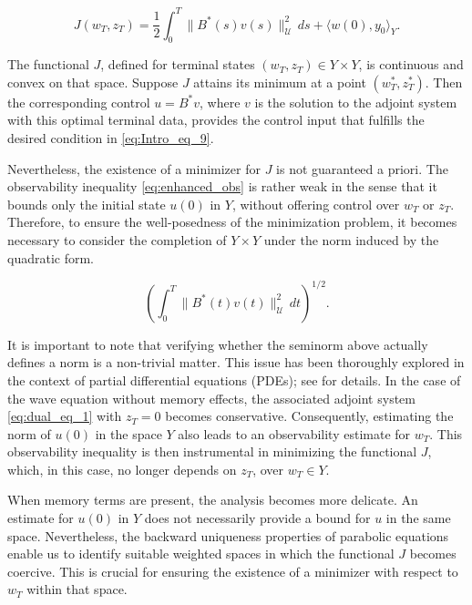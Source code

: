\documentclass[12pt]{article}
\theoremstyle{plain}
\theoremstyle{definition}
\begin{document}
\begin{equation}
J(w_T, z_T) = \frac{1}{2} \int_0^T \|B^*(s)v(s)\|_{\mathcal{U}}^2 \, ds + \langle w(0), y_0 \rangle_Y.
\end{equation}

The functional \( J \), defined for terminal states \( (w_T, z_T) \in Y \times Y \), is continuous and convex on that space. Suppose \( J \) attains its minimum at a point \( (w_T^*, z_T^*) \). Then the corresponding control \( u = B^*v \), where \( v \) is the solution to the adjoint system with this optimal terminal data, provides the control input that fulfills the desired condition in \eqref{eq:Intro_eq_9}.

Nevertheless, the existence of a minimizer for \( J \) is not guaranteed a priori. The observability inequality \eqref{eq:enhanced_obs} is rather weak in the sense that it bounds only the initial state \( u(0) \) in \( Y \), without offering control over \( w_T \) or \( z_T \). Therefore, to ensure the well-posedness of the minimization problem, it becomes necessary to consider the completion of \( Y \times Y \) under the norm induced by the quadratic form.

\begin{equation}
\left( \int_0^T \| B^*(t)v(t) \|_{\mathcal{U}}^2 \, dt \right)^{1/2}.
\end{equation}

It is important to note that verifying whether the seminorm above actually defines a norm is a non-trivial matter. This issue has been thoroughly explored in the context of partial differential equations (PDEs); see \cite{zuazua2007controllability} for details. In the case of the wave equation without memory effects, the associated adjoint system \eqref{eq:dual_eq_1} with \( z_T = 0 \) becomes conservative. Consequently, estimating the norm of \( u(0) \) in the space \( Y \) also leads to an observability estimate for \( w_T \). This observability inequality is then instrumental in minimizing the functional \( J \), which, in this case, no longer depends on \( z_T \), over \( w_T \in Y \).

When memory terms are present, the analysis becomes more delicate. An estimate for \( u(0) \) in \( Y \) does not necessarily provide a bound for \( u \) in the same space. Nevertheless, the backward uniqueness properties of parabolic equations enable us to identify suitable weighted spaces in which the functional \( J \) becomes coercive. This is crucial for ensuring the existence of a minimizer with respect to \( w_T \) within that space.
\end{document}
